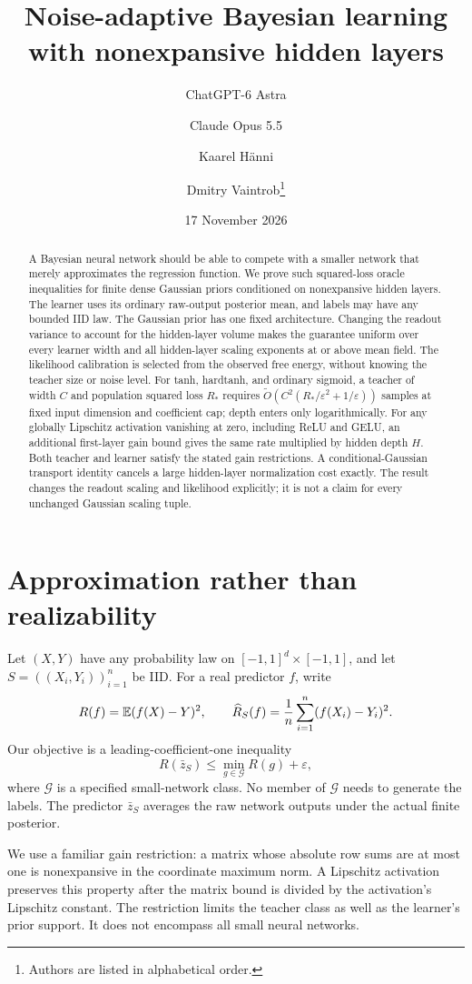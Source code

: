 \documentclass[11pt]{article}
\title{Noise-adaptive Bayesian learning\\with nonexpansive hidden layers}
\author{ChatGPT-6 Astra \and Claude Opus 5.5 \and Kaarel H\"anni \and Dmitry Vaintrob\thanks{Authors are listed in alphabetical order.}}
\date{17 November 2026}
\theoremstyle{definition}\newtheorem{definition}[theorem]{Definition}
\theoremstyle{remark}\newtheorem{remark}[theorem]{Remark}
\begin{document}
\maketitle
\begin{abstract}
A Bayesian neural network should be able to compete with a smaller network that merely approximates the regression function. We prove such squared-loss oracle inequalities for finite dense Gaussian priors conditioned on nonexpansive hidden layers. The learner uses its ordinary raw-output posterior mean, and labels may have any bounded IID law. The Gaussian prior has one fixed architecture. Changing the readout variance to account for the hidden-layer volume makes the guarantee uniform over every learner width and all hidden-layer scaling exponents at or above mean field. The likelihood calibration is selected from the observed free energy, without knowing the teacher size or noise level. For tanh, hardtanh, and ordinary sigmoid, a teacher of width $C$ and population squared loss $R_*$ requires $\widetilde O(C^2(R_*/\varepsilon^2+1/\varepsilon))$ samples at fixed input dimension and coefficient cap; depth enters only logarithmically. For any globally Lipschitz activation vanishing at zero, including ReLU and GELU, an additional first-layer gain bound gives the same rate multiplied by hidden depth $H$. Both teacher and learner satisfy the stated gain restrictions. A conditional-Gaussian transport identity cancels a large hidden-layer normalization cost exactly. The result changes the readout scaling and likelihood explicitly; it is not a claim for every unchanged Gaussian scaling tuple.
\end{abstract}

\section{Approximation rather than realizability}
Let $(X,Y)$ have any probability law on $[-1,1]^d\times[-1,1]$, and let $S=((X_i,Y_i))_{i=1}^n$ be IID. For a real predictor $f$, write
\[
 R(f)=\mathbb E(f(X)-Y)^2,\qquad \widehat R_S(f)=\frac1n\sum_{i=1}^n(f(X_i)-Y_i)^2.
\]
Our objective is a leading-coefficient-one inequality
\[
 R(\bar z_S)\le\min_{g\in\mathcal G}R(g)+\varepsilon,
\]
where $\mathcal G$ is a specified small-network class. No member of $\mathcal G$ needs to generate the labels. The predictor $\bar z_S$ averages the raw network outputs under the actual finite posterior.

We use a familiar gain restriction: a matrix whose absolute row sums are at most one is nonexpansive in the coordinate maximum norm. A Lipschitz activation preserves this property after the matrix bound is divided by the activation's Lipschitz constant. The restriction limits the teacher class as well as the learner's prior support. It does not encompass all small neural networks.
\end{document}
